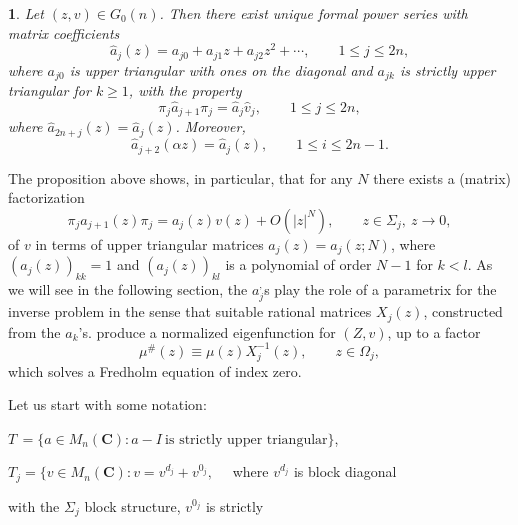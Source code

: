 \documentclass{surv-l}
\theoremstyle{plain}
\newtheorem{prop}[theorem]{\sc{Proposition}}
\theoremstyle{definition}
\numberwithin{equation}{chapter}
\begin{document}
\renewcommand\thetheorem{25.1}
\setcounter{theorem}{0}
\begin{prop}\label{pro25.1}
Let $(z, v) \in G_{0}(n)$. Then there exist unique formal power series with matrix coefficients
\begin{equation*}
\hat{a}_{j}(z)=a_{j 0}+a_{j 1}z+a_{j2}z^{2}+\cdots,  \qquad 1\leq j\leq 2n,
\end{equation*}
where $a_{j0}$ is upper triangular with ones on the diagonal and $a_{jk}$ is strictly upper triangular for $k\geq 1$, with the property
\renewcommand\theequation{25.\arabic{equation}}
\setcounter{equation}{1}
\begin{equation}\label{eq25.2}
\pi_{j}\hat{a}_{j+1}\pi_{j}=\hat{a}_{j}\hat{v}_{j}, \qquad 1\leq j\leq 2n,
\end{equation}
where $\hat{a}_{2n+j}(z)=\hat{a}_{j}(z)$. Moreover,
\begin{equation}\label{eq25.3}
\hat{a}_{j+2}(\alpha z)=\hat{a}_{j}(z),\qquad 1\leq i\leq 2n-1.
\end{equation}
\end{prop}


The proposition above shows, in particular, that for any $N$ there exists a (matrix) factorization
\renewcommand\theequation{25.\arabic{equation}}
\setcounter{equation}{3}
\begin{equation}\label{eq25.4}
\pi_{j}a_{j+1}(z)\pi_{j}=a_{j}(z)v(z)+O(|z|^{N}), \qquad z\in\Sigma_{j},\ z\rightarrow 0,
\end{equation}
of $v$ in terms of upper triangular matrices $a_{j}(z)=a_{j}(z; N)$, where $(a_{j}(z))_{kk}=1$ and $(a_{j}(z))_{kl}$ is a polynomial of order $N-1$ for $k<l$. As we will see in the following section, the $a_{j}^{,}$s play the role of a parametrix for the inverse problem in the sense that suitable rational matrices $X_{j}(z)$, constructed from the $a_{k}$'s. produce a normalized eigenfunction for $(Z, v)$, up to a factor
\begin{equation*}
\mu^{\#}(z)\equiv\mu(z)X_{j}^{-1}(z), \qquad z\in\Omega_{j},
\end{equation*}
which solves a Fredholm equation of index zero.

Let us start with some notation:

$T\,=\{a\in M_{n}(\textbf{C}):a-I \ \text{is strictly upper triangular}\}$,

$T_{j}=\{v\in M_{n}(\textbf{C}):v=v^{d_{j}}+v^{0_{j}},\quad$ where $v^{d_{j}}$ is block diagonal

\qquad \qquad with the $\Sigma_{j}$ block structure, $v^{0_{j}}$ is strictly
\end{document}
